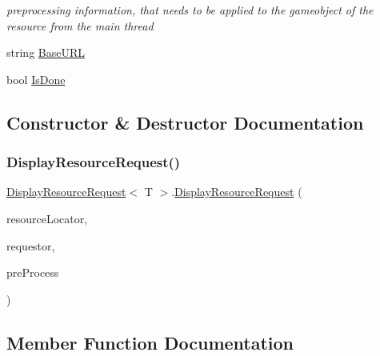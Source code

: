 \begin{DoxyCompactItemize}
\begin{DoxyCompactList}\small\item\em preprocessing information, that needs to be applied to the gameobject of the resource from the main thread \end{DoxyCompactList}\item 
string \mbox{\hyperlink{class_display_resource_request_ab299093412d9885b2b59b8df67683444}{Base\+U\+RL}}
\item 
bool \mbox{\hyperlink{class_display_resource_request_afbe053e1527c852172eb72aa2edb8339}{Is\+Done}}
\end{DoxyCompactItemize}


\subsection{Constructor \& Destructor Documentation}
\mbox{\label{class_display_resource_request_a97001a4fd6ca62ee0c1a2e99f8ad3567}} 
\subsubsection{\texorpdfstring{Display\+Resource\+Request()}{DisplayResourceRequest()}}
{\footnotesize\ttfamily \mbox{\hyperlink{class_display_resource_request}{Display\+Resource\+Request}}$<$ T $>$.\mbox{\hyperlink{class_display_resource_request}{Display\+Resource\+Request}} (\begin{DoxyParamCaption}\item[{int}]{resource\+Locator,  }\item[{\mbox{\hyperlink{class_display}{Display}}}]{requestor,  }\item[{Func$<$ T, \mbox{\hyperlink{class_pre_processing_game_object_information}{Pre\+Processing\+Game\+Object\+Information}}, \mbox{\hyperlink{class_display}{Display}}, I\+Enumerator $>$}]{pre\+Process }\end{DoxyParamCaption})}



\subsection{Member Function Documentation}
\mbox{\label{class_display_resource_request_ab447f9d42e473b8bc8839c6f3d306a17}} 
